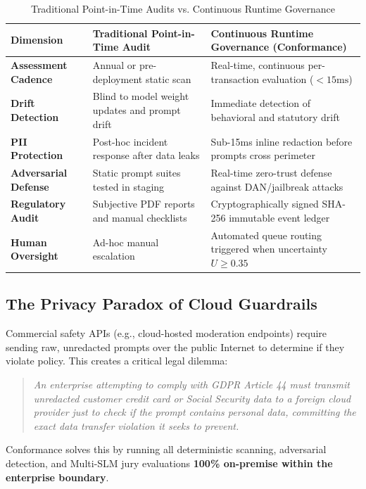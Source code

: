 \documentclass[11pt,a4paper]{article}
\begin{document}
\begin{table}[h]
\caption{Traditional Point-in-Time Audits vs. Continuous Runtime Governance}
\label{tab:comparison}
\centering
\begin{tabularx}{\textwidth}{@{}lXX@{}}
\toprule
\textbf{Dimension} & \textbf{Traditional Point-in-Time Audit} & \textbf{Continuous Runtime Governance (Conformance)} \\ \midrule
\textbf{Assessment Cadence} & Annual or pre-deployment static scan & Real-time, continuous per-transaction evaluation ($<15\text{ms}$) \\
\textbf{Drift Detection} & Blind to model weight updates and prompt drift & Immediate detection of behavioral and statutory drift \\
\textbf{PII Protection} & Post-hoc incident response after data leaks & Sub-15ms inline redaction before prompts cross perimeter \\
\textbf{Adversarial Defense} & Static prompt suites tested in staging & Real-time zero-trust defense against DAN/jailbreak attacks \\
\textbf{Regulatory Audit} & Subjective PDF reports and manual checklists & Cryptographically signed SHA-256 immutable event ledger \\
\textbf{Human Oversight} & Ad-hoc manual escalation & Automated queue routing triggered when uncertainty $U \ge 0.35$ \\ \bottomrule
\end{tabularx}
\end{table}

\subsection{The Privacy Paradox of Cloud Guardrails}
Commercial safety APIs (e.g., cloud-hosted moderation endpoints) require sending raw, unredacted prompts over the public Internet to determine if they violate policy. This creates a critical legal dilemma:

\begin{quote}
\textit{An enterprise attempting to comply with GDPR Article 44 must transmit unredacted customer credit card or Social Security data to a foreign cloud provider just to check if the prompt contains personal data, committing the exact data transfer violation it seeks to prevent.}
\end{quote}

Conformance solves this by running all deterministic scanning, adversarial detection, and Multi-SLM jury evaluations \textbf{100\% on-premise within the enterprise boundary}.
\end{document}
